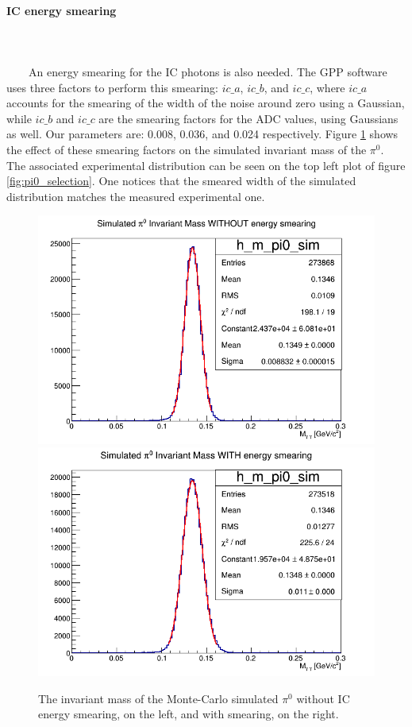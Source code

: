 \paragraph{IC energy smearing}
~\\
~\\
~~~~An energy smearing for the IC photons is also needed. The GPP software uses three factors to perform this smearing: $ic\_a$, $ic\_b$, and $ic\_c$, where $ic\_a$ accounts for the smearing of the width of the noise around zero using a Gaussian, while $ic\_b$ and $ic\_c$ are the smearing factors for the ADC values, using Gaussians as well. Our parameters are: 0.008, 0.036, and 0.024 respectively. Figure \ref{fig:IC_smearing_factors} shows the effect of these smearing factors on the simulated invariant mass of the $\pi^{0}$. The associated experimental distribution can be seen on the top left plot of figure \ref{fig:pi0_selection}. One notices that the smeared width of the simulated distribution matches the measured experimental one.\\

\begin{figure}[tp]
\includegraphics[scale=0.32]{fig_simulation/m_pi0_sim_without_smearing.png}
\includegraphics[scale=0.32]{fig_simulation/m_pi0_sim_with_smearing.png}
\caption{The invariant mass of the Monte-Carlo simulated $\pi^{0}$ without IC energy smearing, on the left, and with smearing, on the right. } 
\label{fig:IC_smearing_factors}
\end{figure}

